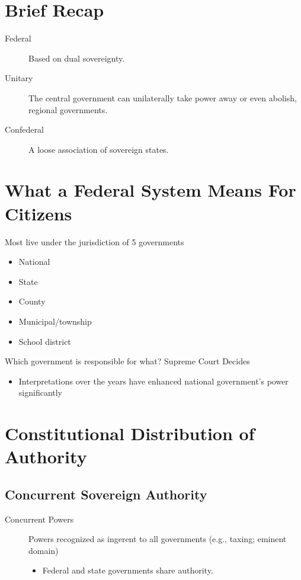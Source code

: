 \section{Brief Recap}
\begin{description}
    \item[Federal] Based on dual sovereignty.
    \item[Unitary] The central government can unilaterally take power away or even abolish, regional governments.
    \item[Confederal] A loose association of sovereign states.
\end{description}
\section{What a Federal System Means For Citizens}
Most live under the jurisdiction of 5 governments
\begin{itemize}
    \item National
    \item State
    \item County
    \item Municipal/township
    \item School district
\end{itemize}
Which government is responsible for what?
Supreme Court Decides
\begin{itemize}
    \item Interpretations over the years have enhanced national government's power significantly
\end{itemize}
\section{Constitutional Distribution of Authority}
\subsection{Concurrent Sovereign Authority}
\begin{description}
    \item[Concurrent Powers] Powers recognized as ingerent to all governments (e.g., taxing; eminent domain)
    \begin{itemize}
        \item Federal and state governments share authority.
    \end{itemize}
\end{description}